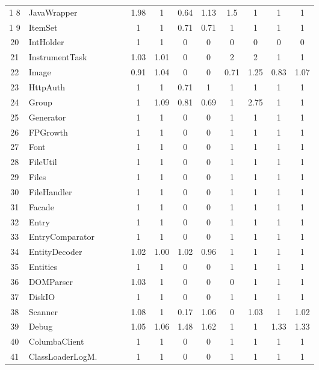 \documentclass[conference]{IEEEtran}
\begin{document}
\begin{tabular}{|c|l|c|c|c|c|c|c|c|c|c|c|c|}
      1	8	& JavaWrapper		&&&	& 1.98	& 1		& 0.64	& 1.13	& 1.5	& 1		& 1		& 1	\\
      1	9	& ItemSet			&&&	& 1		& 1		& 0.71	& 0.71	& 1		& 1		& 1		& 1	\\
      20	& IntHolder		&&&	& 1		& 1		& 0		& 0		& 0		& 0		& 0		& 0	\\
      21	& InstrumentTask	&&&	& 1.03	& 1.01	& 0		& 0		& 2		& 2		& 1		& 1	\\
      22	& Image			&&&	& 0.91	& 1.04	& 0		& 0		& 0.71	& 1.25	& 0.83	& 1.07	\\
      23	& HttpAuth 		&&&	& 1		& 1		& 0.71	& 1		& 1		& 1		& 1		& 1	\\
      24	& Group			&&&	& 1		& 1.09	& 0.81	& 0.69	& 1		& 2.75	& 1		& 1	\\
      25	& Generator		&&&	& 1		& 1		& 0		& 0		& 1		& 1		& 1		& 1	\\
      26	& FPGrowth		&&&	& 1		& 1		& 0		& 0		& 1		& 1		&  1		& 1	\\
      27	& Font 			&&&	& 1		& 1		& 0		& 0		& 1		& 1		& 1		& 1	\\
      28	& FileUtil			&&&	& 1		& 1		& 0		& 0		& 1		& 1		& 1		& 1	\\
      29	& Files			&&&	& 1		& 1		& 0		& 0		& 1		& 1		& 1		& 1	\\
      30	& FileHandler		&&&	& 1		& 1		& 0		& 0		& 1		& 1		& 1		& 1	\\
      31	& Facade			&&&	& 1		& 1		& 0		& 0		& 1		& 1		& 1		& 1	\\
      32	& Entry			&&&	& 1		& 1		& 0		& 0		& 1		& 1		& 1		& 1	\\
      33	& EntryComparator	&&&	& 1		& 1		& 0		& 0		& 1		& 1		& 1		& 1	\\
      34	& EntityDecoder	&&&	& 1.02	& 1.00	& 1.02	& 0.96	&  1		& 1		& 1		& 1	\\
      35	& Entities			&&&	& 1		& 1		& 0		& 0		& 1		& 1		& 1		& 1	\\
      36	& DOMParser		&&&	& 1.03	& 1		& 0		& 0		& 0		& 1		& 1		& 1	\\
      37	& DiskIO			&&&	& 1		& 1		& 0		& 0		& 1		& 1		& 1		& 1	\\
      38	& Scanner		&&&	& 1.08	& 1		& 0.17	& 1.06	& 0		& 1.03	& 1		& 1.02	\\
      39	& Debug			&&&	& 1.05	& 1.06	& 1.48	& 1.62	& 1		& 1		& 1.33	& 1.33	\\
      40	& ColumbaClient	&&&	& 1		& 1		& 0		& 0		& 1		& 1		& 1		& 1	\\
      41	& ClassLoaderLogM.&&&	& 1		& 1		& 0		& 0		& 1		& 1		& 1		& 1	\\

\end{tabular}
\end{document}
